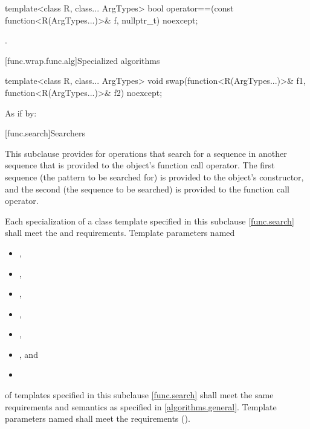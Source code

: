 %
\begin{itemdecl}
template<class R, class... ArgTypes>
  bool operator==(const function<R(ArgTypes...)>& f, nullptr_t) noexcept;
\end{itemdecl}

\begin{itemdescr}
\pnum
\returns
{}.
\end{itemdescr}

[func.wrap.func.alg]{Specialized algorithms}

%
\begin{itemdecl}
template<class R, class... ArgTypes>
  void swap(function<R(ArgTypes...)>& f1, function<R(ArgTypes...)>& f2) noexcept;
\end{itemdecl}

\begin{itemdescr}
\pnum
\effects
As if by: 
\end{itemdescr}%

[func.search]{Searchers}

\pnum
This subclause provides
 for
operations that search for a sequence  in another
sequence  that is provided to the object's function call
operator.  The first sequence (the pattern to be searched for) is provided to
the object's constructor, and the second (the sequence to be searched) is
provided to the function call operator.

\pnum
Each specialization of a class template specified in this subclause \ref{func.search}
shall meet the  and  requirements.
Template parameters named
\begin{itemize}
\item {},
\item {},
\item {},
\item {},
\item {},
\item {}, and
\item {}
\end{itemize}
of templates specified in this subclause
\ref{func.search} shall meet the same requirements and semantics as
specified in \ref{algorithms.general}.
Template parameters named  shall meet the 
requirements ().

